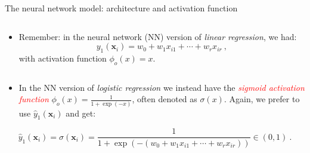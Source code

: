 \documentclass[10pt,ignorenonframetext,]{beamer}
\providecommand{\tightlist}{%
  \setlength{\itemsep}{0pt}\setlength{\parskip}{0pt}}
\begin{document}
\begin{frame}

\begin{block}{The neural network model: architecture and activation
function}

\(~\)

\begin{itemize}
\tightlist
\item
  Remember: in the neural network (NN) version of \emph{linear
  regression}, we had:
  \[ y_1({\boldsymbol x}_i)=w_0+w_1 x_{i1}+\cdots + w_r x_{ir} \ , \]
  with activation function \(\phi_o(x)=x\).
\end{itemize}

\(~\)

\begin{itemize}
\tightlist
\item
  In the NN version of \emph{logistic regression} we instead have the
  \emph{\textcolor{red}{sigmoid activation function}}
  \(\phi_o(x)=\frac{1}{1+\exp(-x)}\), often denoted as \(\sigma(x)\).
  Again, we prefer to use \(\hat{y}_1({\boldsymbol x}_i)\) and get:
\end{itemize}

\[ 
\hat{y}_1({\boldsymbol x}_i)= \sigma({\boldsymbol x}_i) = \frac{1}{1+\exp(-(w_0+w_1 x_{i1}+\cdots + w_r x_{ir}))} \in (0,1) \ . 
\]

\end{block}

\end{frame}
\end{document}
